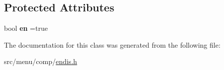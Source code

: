 \subsection*{Protected Attributes}
\begin{DoxyCompactItemize}
\item 
\mbox{\label{classEnDis_ae330fda96a39800098254c261b18d889}} 
bool {\bfseries en} =true
\end{DoxyCompactItemize}


The documentation for this class was generated from the following file\+:\begin{DoxyCompactItemize}
\item 
src/menu/comp/\hyperlink{endis_8h}{endis.\+h}\end{DoxyCompactItemize}
